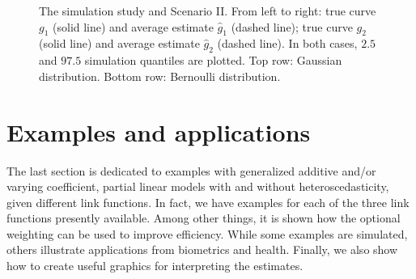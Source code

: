 \begin{figure}[htb]
\centering
{}
\caption{The simulation study and Scenario II. From left to right: true curve $g_1$ (solid line) and average estimate $\hat{g}_1$ (dashed line); true curve $g_2$ (solid line) and average estimate $\hat{g}_2$ (dashed line). In both cases, $2.5$ and $97.5$ simulation quantiles are plotted. Top row: Gaussian distribution. Bottom row: Bernoulli distribution. \label{simu-sceII}}
\end{figure}

\section{Examples and applications} \label{sec-examples}
The last section is dedicated to examples with generalized additive and/or varying coefficient, partial linear models with and without heteroscedasticity, given different link functions. In fact, we have examples for each of the three link functions presently available. Among other things, it is shown how the optional weighting can be used to improve efficiency. While some examples are simulated, others illustrate applications from biometrics and health. Finally, we also show how to create useful graphics for interpreting the estimates. 

